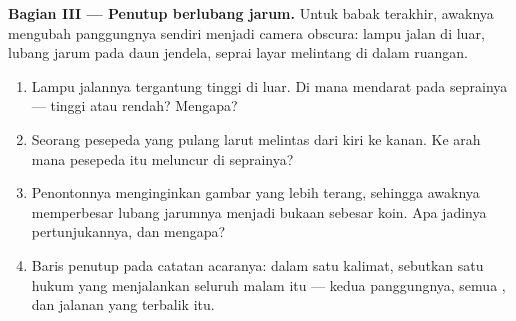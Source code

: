 \begin{problem}
\medskip\noindent\textbf{Bagian III --- Penutup berlubang jarum.}
Untuk babak terakhir, awaknya mengubah panggungnya sendiri menjadi
camera obscura: lampu jalan di luar, lubang jarum pada daun jendela,
seprai layar melintang di dalam ruangan.
\begin{enumerate}[resume]
  \item Lampu jalannya tergantung tinggi di luar. Di mana
         mendarat pada seprainya --- tinggi atau rendah?
        Mengapa?
  \item Seorang pesepeda yang pulang larut melintas dari kiri ke
        kanan. Ke arah mana  pesepeda itu meluncur di
        seprainya?
  \item Penontonnya menginginkan gambar yang lebih terang, sehingga
        awaknya memperbesar lubang jarumnya menjadi bukaan sebesar
        koin. Apa jadinya pertunjukannya, dan mengapa?
  \item Baris penutup pada catatan acaranya: dalam satu kalimat,
        sebutkan satu hukum yang menjalankan seluruh malam itu ---
        kedua panggungnya, semua , dan jalanan yang
        terbalik itu.
\end{enumerate}
\end{problem}

